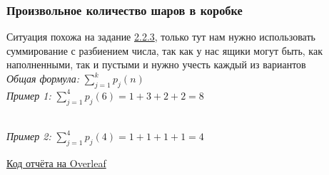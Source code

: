 \documentclass{article}
\begin{document}
            \subsubsection{Произвольное количество шаров в коробке}
                Ситуация похожа на задание \hyperlink{2b3}{2.2.3}, только тут нам нужно использовать суммирование с разбиением числа, так как у нас ящики могут быть, как наполненными, так и пустыми и нужно учесть каждый из вариантов\\
                \textit{Общая формула:} $ \sum\limits_{j=1}^{k} p_j(n) $\\
                \textit{Пример 1:} $ \sum\limits_{j=1}^{4} p_j(6) = 1 + 3 + 2 + 2 = 8 $
                \begin{figure}[h!]
                \end{figure}\\
                \textit{Пример 2:} $ \sum\limits_{j=1}^{4} p_j(4) = 1 + 1 + 1 + 1 = 4 $
                \begin{figure}[h!]
                \end{figure}
    \vfill
    \bigskip
    \small
    \begin{flushright}
        \href{https://ru.overleaf.com/read/nhnmvfbjzwhf}{Код отчёта на Overleaf}
    \end{flushright}
\end{document}
